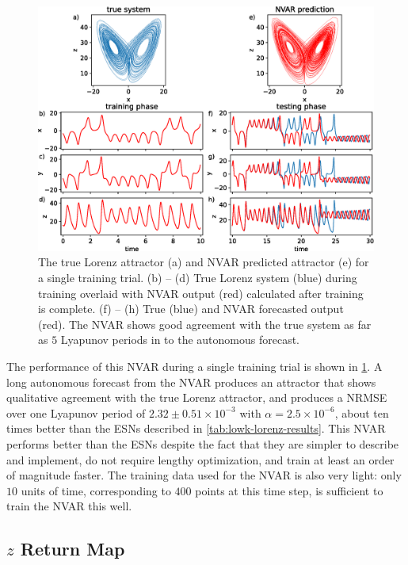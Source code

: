 \begin{figure}
  \includegraphics[width=\textwidth]{figures/nvar-predict-lorenz}
  \caption{The true Lorenz attractor (a) and NVAR predicted attractor
    (e) for a single training trial. (b) -- (d) True Lorenz system
    (blue) during training overlaid with NVAR output (red) calculated
    after training is complete. (f) -- (h) True (blue) and NVAR
    forecasted output (red). The NVAR shows good agreement with the
    true system as far as $5$ Lyapunov periods in to the autonomous
    forecast.}
  \label{fig:nvar-predict-lorenz}
\end{figure}

The performance of this NVAR during a single training trial is shown
in \cref{fig:nvar-predict-lorenz}. A long autonomous forecast from the
NVAR produces an attractor that shows qualitative agreement with the
true Lorenz attractor, and produces a NRMSE over one Lyapunov period
of $2.32\pm0.51\times10^{-3}$ with $\alpha = 2.5\times10^{-6}$, about
ten times better than the ESNs described in
\cref{tab:lowk-lorenz-results}. This NVAR performs better than the
ESNs despite the fact that they are simpler to describe and implement,
do not require lengthy optimization, and train at least an order of
magnitude faster. The training data used for the NVAR is also very
light: only $10$ units of time, corresponding to $400$ points at this
time step, is sufficient to train the NVAR this well.

\subsection{$z$ Return Map}

